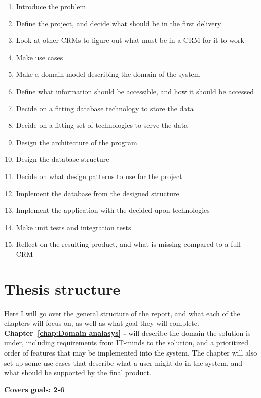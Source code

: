 \begin{enumerate}
  \item Introduce the problem
  \item Define the project, and decide what should be in the first delivery
  \item Look at other CRMs to figure out what must be in a CRM for it to work
  \item Make use cases
  \item Make a domain model describing the domain of the system
  \item Define what information should be accessible, and how it should be accessed
  \item Decide on a fitting database technology to store the data
  \item Decide on a fitting set of technologies to serve the data
  \item Design the architecture of the program
  \item Design the database structure
  \item Decide on what design patterns to use for the project
  \item Implement the database from the designed structure
  \item Implement the application with the decided upon technologies
  \item Make unit tests and integration tests
  \item Reflect on the resulting product, and what is missing compared to a full CRM
\end{enumerate}

\section{Thesis structure}
\label{sec:Thesis structure}
Here I will go over the general structure of the report, and what each of the chapters will focus on, as well as what goal they will complete.\\

\textbf{Chapter~\ref{chap:Domain analasys} - } will describe the domain the solution is under, including requirements from IT-minds to the solution, and a prioritized order of features that may be implemented into the system. The chapter will also set up some use cases that describe what a user might do in the system, and what should be supported by the final product.

\textbf{Covers goals: 2-6}\\

